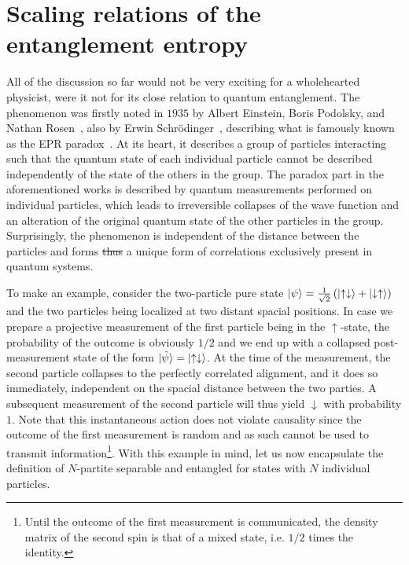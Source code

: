 \documentclass{svmono}
\newcommand{\brlr}[1]{\left( #1 \right)}
\providecommand{\DIFdeltex}[1]{{\protect\color{red}\sout{#1}}}                      %
\providecommand{\DIFdelbegin}{} %
\providecommand{\DIFdelend}{} %
\providecommand{\DIFdel}[1]{\texorpdfstring{\DIFdeltex{#1}}{}} %
\newcommand{\DIFscaledelfig}{0.5}
\newlength{\DIFdelgraphicswidth} %
\newlength{\DIFdelgraphicsheight} %
\newcommand{\DIFdelincludegraphics}[2][]{%
\sbox{\DIFdelgraphicsbox}{\DIFOincludegraphics[#1]{#2}}%
\settoboxwidth{\DIFdelgraphicswidth}{\DIFdelgraphicsbox} %
\settoboxtotalheight{\DIFdelgraphicsheight}{\DIFdelgraphicsbox} %
\scalebox{\DIFscaledelfig}{%
\parbox[b]{\DIFdelgraphicswidth}{\usebox{\DIFdelgraphicsbox}\\[-\baselineskip] \rule{\DIFdelgraphicswidth}{0em}}\llap{\resizebox{\DIFdelgraphicswidth}{\DIFdelgraphicsheight}{%
\setlength{\unitlength}{\DIFdelgraphicswidth}%
\begin{picture}(1,1)%
\thicklines\linethickness{2pt} %
{\color[rgb]{1,0,0}\put(0,0){\framebox(1,1){}}}%
{\color[rgb]{1,0,0}\put(0,0){\line( 1,1){1}}}%
{\color[rgb]{1,0,0}\put(0,1){\line(1,-1){1}}}%
\end{picture}%
}\hspace*{3pt}}} %
} %
\DeclareRobustCommand{\DIFdelbegin}{\DIFOdelbegin \let\includegraphics\DIFdelincludegraphics} %
\DeclareRobustCommand{\DIFdelend}{\DIFOaddend \let\includegraphics\DIFOincludegraphics} %
\begin{document}
\section{Scaling relations of the entanglement entropy}
\label{sec:scaling_relations_of_the_entanglement_entropy}
All of the discussion so far would not be very exciting for a wholehearted physicist, were it not for its close relation to quantum entanglement.
The phenomenon was firstly noted in $1935$ by Albert Einstein, Boris Podolsky, and Nathan Rosen~\cite{EPR1935}, also by Erwin Schrödinger~\cite{Schrdinger1935,Schrdinger1936}, describing what is famously known as the EPR paradox~\cite{Reid2009}.
At its heart, it describes a group of particles interacting such that the quantum state of each individual particle cannot be described independently of the state of the others in the group.
The paradox part in the aforementioned works is described by quantum measurements performed on individual particles, which leads to irreversible collapses of the wave function and an alteration of the original quantum state of the other particles in the group.
Surprisingly, the phenomenon is independent of the distance between the particles and forms \DIFdelbegin \DIFdel{thus }\DIFdelend a unique form of correlations exclusively present in quantum systems.

To make an example, consider the two-particle pure state $\ket{\psi}=\frac1{\sqrt2}\brlr{\ket{\uparrow\downarrow}+\ket{\downarrow\uparrow}}$ and the two particles being localized at two distant spacial positions.
In case we prepare a projective measurement of the first particle being in the $\uparrow$-state, the probability of the outcome is obviously $1/2$ and we end up with a collapsed post-measurement state of the form $\ket{\tilde\psi} = \ket{\uparrow\downarrow}$.
At the time of the measurement, the second particle collapses to the perfectly correlated alignment, and it does so immediately, independent on the spacial distance between the two parties.
A subsequent measurement of the second particle will thus yield $\downarrow$ with probability $1$.
Note that this instantaneous action does not violate causality since the outcome of the first measurement is random and as such cannot be used to transmit information\footnote{Until the outcome of the first measurement is communicated, the density matrix of the second spin is that of a mixed state, i.e. $1/2$ times the identity.}.
With this example in mind, let us now encapsulate the definition of $N$-partite separable and entangled for states with $N$ individual particles.
\end{document}
